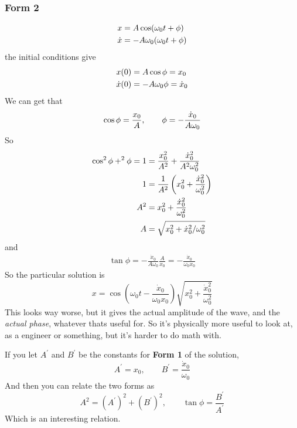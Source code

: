 \documentclass{article}
\let\sin\relax
\DeclareMathOperator{\sin}{\smash{\mathrm{sin}}}
\begin{document}
\subsubsection{Form 2}
\begin{align*}
    x &= A\cos(\omega_0t + \phi) \\ 
    \dot{x} &= -A\omega_0\sin(\omega_0t + \phi) 
\end{align*}
the initial conditions give
\begin{align*}
    x(0) &= A\cos\phi = x_0\\ 
    \dot{x}(0) &= -A\omega_0\sin\phi = \dot{x}_0
\end{align*}
We can get that 
\begin{equation*}
    \cos\phi = \frac{x_0}{A}, \qquad \sin\phi = -\frac{\dot{x}_0}{A\omega_0}
\end{equation*}
So 
\begin{align*}
    \cos^2\phi + \sin^2\phi = 1 &= \frac{x_0^2}{A^2} + \frac{\dot{x}_0^2}{A^2\omega_0^2} \\ 
    1 & = \frac{1}{A^2}\left(x_0^2 + \frac{\dot{x}_0^2}{\omega_0^2}\right) \\
    A^2 & = x_0^2 + \frac{\dot{x}_0^2}{\omega_0^2} \\ 
    A &= \sqrt{x_0^2 + \dot{x}_0^2/\omega_0^2}
\end{align*}
and
\begin{align*}
    \tan\phi = -\frac{\dot{x}_0}{A\omega_0} \frac{A}{x_0} = -\frac{\dot{x}_0}{\omega_0x_0}
\end{align*}
So the particular solution is
\begin{equation*}
    x = \cos\!\left(\omega_0t -\frac{\dot{x}_0}{\omega_0x_0}\right)\sqrt{x_0^2 + \frac{\dot{x}_0^2}{\omega_0^2}}
\end{equation*}
This looks way worse, but it gives the actual amplitude of the wave, and the \textit{actual phase}, whatever thats useful for. So it's physically more useful to look at, as a engineer or something, but it's harder to do math with.

If you let $A^\prime$ and $B^\prime$ be the constants for \textbf{Form 1} of the solution,
\begin{equation*}
    A^\prime = x_0, \qquad B^\prime = \frac{\dot{x}_0}{\omega_0}
\end{equation*}
And then you can relate the two forms as
\begin{equation*}
    A^2 = (A^\prime)^2 + (B^\prime)^2, \qquad \tan\phi = \frac{B^\prime}{A^\prime}
\end{equation*}
Which is an interesting relation.
\end{document}
